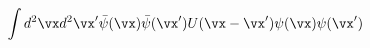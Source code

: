 \begin{equation}
     \int
     d^2\vx d^2\vx'\bar{\psi}(\vx)\bar{\psi}(\vx')U(\vx-\vx')
     \psi(\vx)\psi(\vx')
     \label{2ndquantint}
\end{equation}

